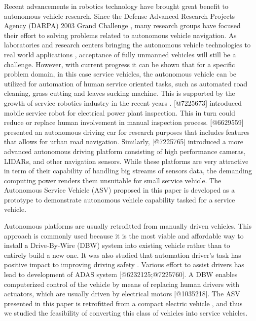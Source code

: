 \documentclass[10 pt,a4paper,conference]{IEEEtran}
\begin{document}
Recent advancements in robotics technology have brought great benefit to
autonomous vehicle research. Since the Defense Advanced Research
Projects Agency (DARPA) 2003 Grand Challenge
\citep{ventures2006stanley}, many research groups have focused their
effort to solving problems related to autonomous vehicle navigation. As
laboratories and research centers bringing the autonomous vehicle
technologies to real world applications \citep{Ford_Jan_16}, acceptance
of fully unmanned vehicles will still be a challenge. However, with
current progress it can be shown that for a specific problem domain, in
this case service vehicles, the autonomous vehicle can be utilized for
automation of human service oriented tasks, such as automated road
cleaning, grass cutting and leaves sucking machine. This is supported by
the growth of service robotics industry in the recent years
\citep{SVR_Nov_15}. \citeauthor{7225673} {[}@7225673{]} introduced
mobile service robot for electrical power plant inspection. This in turn
could reduce or replace human involvement in manual inspection process.
\citeauthor{6629559} {[}@6629559{]} presented an autonomous driving car
for research purposes that includes features that allows for urban road
navigation. Similarly, \citeauthor{7225765} {[}@7225765{]} introduced a
more advanced autonomous driving platform consisting of high performance
cameras, LIDARs, and other navigation sensors. While these platforms are
very attractive in term of their capability of handling big streams of
sensors data, the demanding computing power renders them unsuitable for
small service vehicle. The Autonomous Service Vehicle (ASV) proposed in
this paper is developed as a prototype to demonstrate autonomous vehicle
capability tasked for a service vehicle.

Autonomous platforms are usually retrofitted from manually driven
vehicles. This approach is commonly used because it is the most viable
and affordable way to install a Drive-By-Wire (DBW) system into existing
vehicle rather than to entirely build a new one. It was also studied
that automation driver's task has positive impact to improving driving
safety \citep{stanton1996fly}. Various effort to assist drivers has lead
to development of ADAS system {[}@6232125;@7225760{]}. A DBW enables
computerized control of the vehicle by means of replacing human drivers
with actuators, which are usually driven by electrical motors
{[}@1035218{]}. The ASV presented in this paper is retrofitted from a
compact electric vehicle \citep{SongZW_IV_2015}, and thus we studied the
feasibility of converting this class of vehicles into service vehicles.
\end{document}
